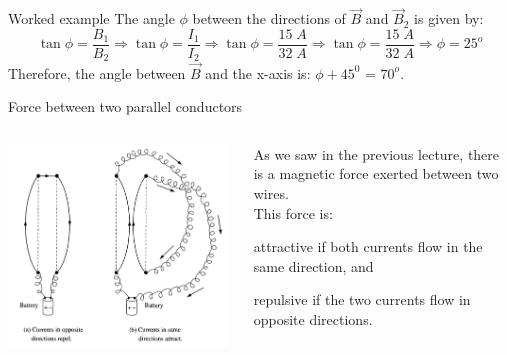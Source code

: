 {\begin{frame}{Worked example}
{\small
The angle $\phi$ between the directions of $\vec{B}$ and $\vec{B}_2$
is given by:
\begin{equation*}
  \tan\phi = \frac{B_1}{B_2} \Rightarrow
  \tan\phi = \frac{I_1}{I_2} \Rightarrow
  \tan\phi = \frac{15\;A}{32\;A} \Rightarrow
  \tan\phi = \frac{15\;A}{32\;A} \Rightarrow
  \phi = 25^o
\end{equation*}
Therefore, the angle between $\vec{B}$ and the x-axis
is: $\phi + 45^0$ = $70^o$.
}

\end{frame}


} %

%
%
%

\begin{frame}{Force between two parallel conductors}

\begin{columns}
  \begin{column}{0.60\textwidth}
    \begin{center}
      \includegraphics[width=0.98\textwidth]{./images/schematics/magnetic_force_between_wires_01.png}\\
    \end{center}
  \end{column}
  \begin{column}{0.40\textwidth}
   {\small
      As we saw in the previous lecture, there is a magnetic force exerted between two wires.\\
      This force is:
      \begin{itemize}
      {\small
         \item attractive if both currents flow in the same direction, and
         \item repulsive if the two currents flow in opposite directions.
      }
      \end{itemize}
   }
  \end{column}
\end{columns}

\end{frame}


